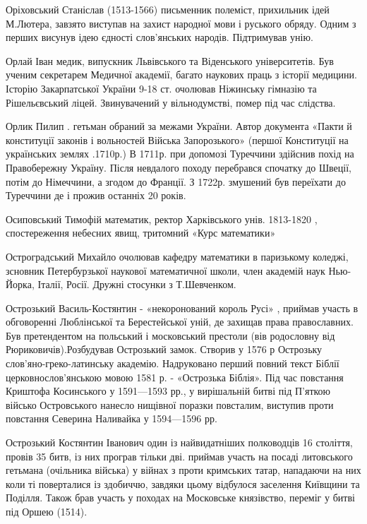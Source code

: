 Оріховський Станіслав  (1513-1566) письменник полеміст, прихильник ідей М.Лютера, завзято виступав на захист народної мови і руського обряду. Одним з перших висунув ідею єдності слов'янських народів. Підтримував унію.

Орлай Іван медик, випускник Львівського та Віденського університетів. Був ученим секретарем Медичної академії, багато наукових праць з історії медицини. Історію Закарпатської України 9-18 ст. очолював Ніжинську гімназію та Рішельєвський ліцей. Звинувачений у вільнодумстві, помер під час слідства.

Орлик Пилип . гетьман обраний за межами України. Автор документа «Пакти й конституції законів і вольностей Війська Запорозького» (першої Конституції на українських землях .1710р.) В 1711р. при допомозі Туреччини здійснив похід на Правобережну Україну. Після невдалого походу перебрався спочатку до Швеції, потім до Німеччини, а згодом до Франції. З 1722р. змушений був переїхати до Туреччини де і прожив останніх 20 років.

Осиповський Тимофій математик, ректор Харківського унів. 1813-1820 , спостереження небесних явищ, тритомний «Курс математики»

Остроградський Михайло очолював кафедру математики в паризькому коледжі, зсновник Петербурзької наукової математичної школи, член академій наук Нью-Йорка, Італії, Росії. Дружні стосунки з Т.Шевченком.

Острозький Василь-Костянтин  - «некоронований король Русі» , приймав участь в обговоренні Люблінської та Берестейської уній, де захищав права православних. Був претендентом на польський і московський престоли (вів родословну від Рюриковичів).Розбудував Острозький замок. Створив у 1576 р Острозьку слов'яно-греко-латинську академію. Надруковано перший повний текст Біблії церковнослов’янською мовою 1581 р. - «Острозька Біблія». Під час повстання Криштофа Косинського у 1591—1593 рр., у вирішальній битві під П’яткою військо Островського нанесло нищівної поразки повсталим, виступив проти повстання Северина Наливайка у 1594—1596 рр.

Острозький Костянтин Іванович  один із найвидатніших полководців 16 століття, провів 35 битв, із них програв тільки дві. приймав участь на посаді литовського гетьмана (очільника війська) у війнах з проти кримських татар, нападаючи на них коли ті поверталися із здобиччю, завдяки цьому відбулося заселення Київщини та Поділля. Також брав участь у походах на Московське князівство, переміг у битві під Оршею (1514).

